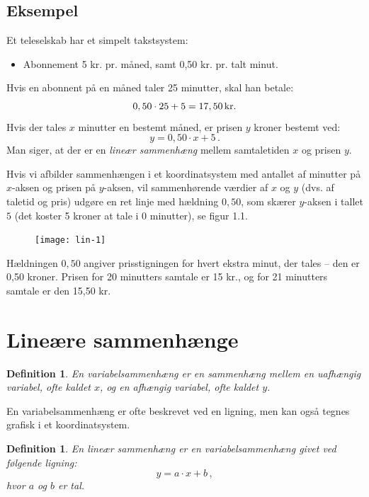 \documentclass[12pt,oneside,a4paper]{article}
\newtheorem{mydef}[thm]{Definition}
\begin{document}
\begin{tcolorbox}
\subsection{Eksempel}
Et teleselskab har et simpelt takstsystem:
\begin{itemize}
    \item Abonnement 5 kr. pr. måned, samt 0,50 kr. pr. talt minut.
\end{itemize}
Hvis en abonnent på en måned taler 25 minutter, skal han betale:
\[
0,50\cdot25 + 5 = 17,50 \, {\rm kr}.
\]
Hvis der tales $x$ minutter en bestemt måned, er prisen $y$ kroner bestemt ved:
\[
y = 0,50\cdot x + 5 \,.
\]
Man siger, at der er en {\em lineær sammenhæng} mellem samtaletiden $x$ og prisen $y$.

Hvis vi afbilder sammenhængen i et koordinatsystem med antallet af minutter på
$x$-aksen og prisen på $y$-aksen, vil sammenhørende værdier af $x$ og $y$ (dvs.
af taletid og pris) udgøre en ret linje med hældning $0,50$, som skærer
$y$-aksen i tallet $5$ (det koster 5 kroner at tale i 0 minutter), se figur
1.1.

\begin{figure}[H]
    \centering
    \texttt{[image: lin-1]}
    \caption{}
\end{figure}

Hældningen $0,50$ angiver prisstigningen for hvert ekstra minut, der tales --
den er 0,50 kroner.  Prisen for 20 minutters samtale er 15 kr., og for 21
minutters samtale er den 15,50 kr.
\end{tcolorbox}



\section{Lineære sammenhænge}
\begin{tcolorbox}
\begin{mydef}
    En {\em variabelsammenhæng} er en sammenhæng mellem en uafhængig variabel, ofte
    kaldet $x$, og en afhængig variabel, ofte kaldet $y$.
\end{mydef}
\end{tcolorbox}

En variabelsammenhæng er ofte beskrevet ved en ligning, men kan også tegnes grafisk i et
koordinatsystem.

\begin{tcolorbox}
\begin{mydef}
    En {\em lineær sammenhæng} er en variabelsammenhæng givet ved følgende ligning:
    $$
    y = a\cdot x + b \,,
    $$
    hvor $a$ og $b$ er tal.
\end{mydef}
\end{tcolorbox}
\end{document}
